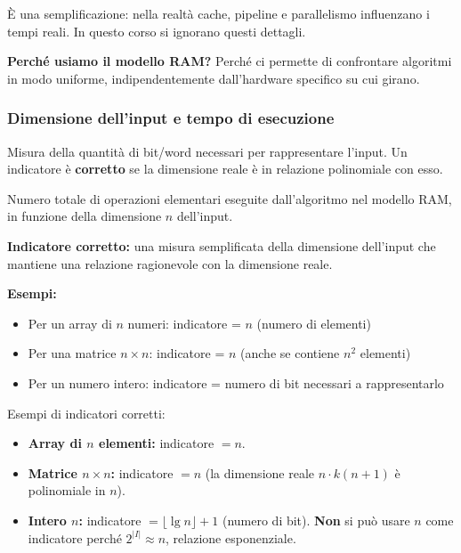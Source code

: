 \begin{nota}
	È una semplificazione: nella realtà cache, pipeline e
	parallelismo influenzano i tempi reali. In questo corso
	si ignorano questi dettagli.
	
	\textbf{Perché usiamo il modello RAM?} Perché ci permette di confrontare algoritmi in modo uniforme, indipendentemente dall'hardware specifico su cui girano.
\end{nota}

\subsubsection*{Dimensione dell'input e tempo di esecuzione}

\begin{definizione}
	Misura della quantità di bit/word necessari per rappresentare
	l'input. Un indicatore è \textbf{corretto} se la dimensione
	reale è in relazione polinomiale con esso.
\end{definizione}

\begin{definizione}
	Numero totale di operazioni elementari eseguite dall'algoritmo
	nel modello RAM, in funzione della dimensione $n$ dell'input.
\end{definizione}

\begin{nota}
	\textbf{Indicatore corretto:} una misura semplificata della dimensione dell'input che mantiene una relazione ragionevole con la dimensione reale.
	
	\textbf{Esempi:}
	\begin{itemize}
		\item Per un array di $n$ numeri: indicatore = $n$ (numero di elementi)
		\item Per una matrice $n \times n$: indicatore = $n$ (anche se contiene $n^2$ elementi)
		\item Per un numero intero: indicatore = numero di bit necessari a rappresentarlo
	\end{itemize}
\end{nota}

Esempi di indicatori corretti:
\begin{itemize}
	\item \textbf{Array di $n$ elementi:} indicatore $= n$. \checkmark
	\item \textbf{Matrice $n \times n$:} indicatore $= n$
	(la dimensione reale $n \cdot k(n+1)$ è polinomiale in $n$).
	\checkmark
	\item \textbf{Intero $n$:} indicatore $= \lfloor \lg n \rfloor + 1$
	(numero di bit). \textbf{Non} si può usare $n$ come
	indicatore perché $2^{|I|} \approx n$, relazione
	esponenziale. \checkmark
\end{itemize}

